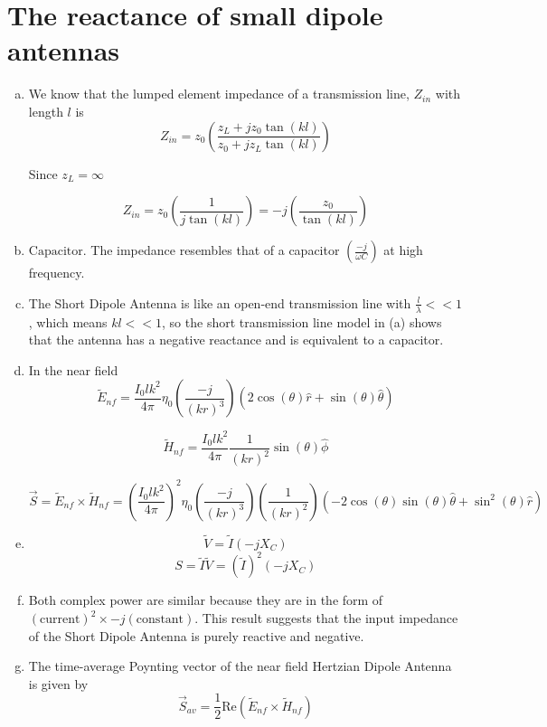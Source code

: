\documentclass{article} %
\begin{document}
\section{The reactance of small dipole antennas}
\begin{enumerate}[(a)]
      \item We know that the lumped element impedance of a transmission line, $Z_{in}$ with length $l$ is
            \[Z_{in} = z_0\left(\frac{z_L + j z_0 \tan(k l)}{z_0 + j z_L \tan(kl)}\right)\]

            Since $z_L = \infty$

            \[Z_{in} = z_0 \left(\frac{1}{j \tan(kl)}\right) = \boxed{-j \left(\frac{z_0}{\tan(kl)}\right)}\]
      \item $\boxed{\text{Capacitor}}$. The impedance resembles that of a capacitor $\left(\frac{-j}{\omega C}\right)$ at high frequency.
      \item The Short Dipole Antenna is like an open-end transmission line with $\frac{l}{\lambda} << 1$, which means $kl << 1$, so the short transmission line model in (a) shows that the antenna has a negative reactance and is equivalent to a capacitor.
      \item In the near field
            \[\widetilde{E}_{nf} = \frac{I_0 l k^2}{4\pi} \eta_0 \left(\frac{-j}{(kr)^3}\right)(2 \cos(\theta) \hat{r} + \sin(\theta) \hat{\theta})\]

            \[\widetilde{H}_{nf} = \frac{I_0 l k^2}{4\pi} \frac{1}{(kr)^2} \sin(\theta) \hat{\phi}\]

            \[\vec{S} = \widetilde{E}_{nf} \times \widetilde{H}_{nf} = \boxed{\left(\frac{I_0 l k^2}{4\pi}\right)^2 \eta_0 \left(\frac{-j}{(kr)^3}\right)\left(\frac{1}{(kr)^2}\right) (-2 \cos(\theta)\sin(\theta) \hat{\theta} + \sin^2(\theta) \hat{r})}\]
      \item
            \[\widetilde{V} = \widetilde{I}(-jX_C)\]
            \[S = \widetilde{I}\widetilde{V} = \boxed{(\widetilde{I})^2 (-jX_C)}\]
      \item Both complex power are similar because they are in the form of $(\text{current})^2 \times -j (\text{constant})$. This result suggests that the input impedance of the Short Dipole Antenna is purely reactive and negative.
      \item The time-average Poynting vector of the near field Hertzian Dipole Antenna is given by
            \[\vec{S}_{av} = \frac{1}{2}\text{Re}(\widetilde{E}_{nf} \times \widetilde{H}_{nf})\]


\end{enumerate}
\end{document}
